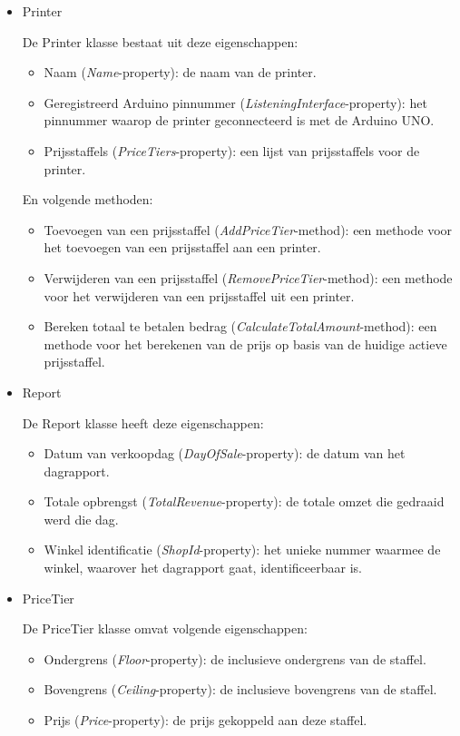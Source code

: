 \begin{itemize}
    \item Printer
    
    De Printer klasse bestaat uit deze eigenschappen:
    
    \begin{itemize}
        \item Naam (\textit{Name}-property): de naam van de printer.
        \item Geregistreerd Arduino pinnummer (\textit{ListeningInterface}-property): het pinnummer waarop de printer geconnecteerd is met de Arduino UNO.
        \item Prijsstaffels (\textit{PriceTiers}-property): een lijst van prijsstaffels voor de printer.
    \end{itemize}

    En volgende methoden:
    \begin{itemize}
        \item Toevoegen van een prijsstaffel (\textit{AddPriceTier}-method): een methode voor het toevoegen van een prijsstaffel aan een printer.
        \item Verwijderen van een prijsstaffel (\textit{RemovePriceTier}-method): een methode voor het verwijderen van een prijsstaffel uit een printer.
        \item Bereken totaal te betalen bedrag (\textit{CalculateTotalAmount}-method): een methode voor het berekenen van de prijs op basis van de huidige actieve prijsstaffel.
    \end{itemize}
    
    \item Report
    
    De Report klasse heeft deze eigenschappen:
    
    \begin{itemize}
        \item Datum van verkoopdag (\textit{DayOfSale}-property): de datum van het dagrapport.
        \item Totale opbrengst (\textit{TotalRevenue}-property): de totale omzet die gedraaid werd die dag.
        \item Winkel identificatie (\textit{ShopId}-property): het unieke nummer waarmee de winkel, waarover het dagrapport gaat, identificeerbaar is.
    \end{itemize}

    \item PriceTier
    
    De PriceTier klasse omvat volgende eigenschappen:
    
    \begin{itemize}
        \item Ondergrens (\textit{Floor}-property): de inclusieve ondergrens van de staffel.
        \item Bovengrens (\textit{Ceiling}-property): de inclusieve bovengrens van de staffel.
        \item Prijs (\textit{Price}-property): de prijs gekoppeld aan deze staffel.
    \end{itemize}
    
\end{itemize}


